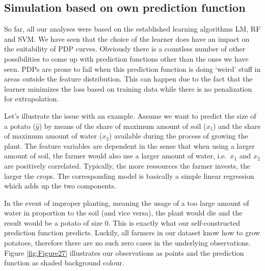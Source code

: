\documentclass[
]{krantz}
\begin{document}
\hypertarget{ExtrapolationProblemPrediction}{%
\subsection{Simulation based on own prediction function}\label{ExtrapolationProblemPrediction}}

So far, all our analyses were based on the established learning algorithms LM, RF and SVM. We have seen that the choice of the learner does have an impact on the suitability of PDP curves. Obviously there is a countless number of other possibilities to come up with prediction functions other than the ones we have seen. PDPs are prone to fail when this prediction function is doing `weird' stuff in areas outside the feature distribution. This can happen due to the fact that the learner minimizes the loss based on training data while there is no penalization for extrapolation.\citep{molnar2019}

Let's illustrate the issue with an example. Assume we want to predict the size of a potato (\(\hat{y}\)) by means of the share of maximum amount of soil (\(x_1\)) and the share of maximum amount of water (\(x_2\)) available during the process of growing the plant. The feature variables are dependent in the sense that when using a larger amount of soil, the farmer would also use a larger amount of water, i.e.~\(x_1\) and \(x_2\) are positively correlated. Typically, the more ressources the farmer invests, the larger the crops. The corresponding model is basically a simple linear regression which adds up the two components.

In the event of improper planting, meaning the usage of a too large amount of water in proportion to the soil (and vice versa), the plant would die and the result would be a potato of size 0. This is exactly what our self-constructed prediction function predicts. Luckily, all farmers in our dataset know how to grow potatoes, therefore there are no such zero cases in the underlying observations. Figure \ref{fig:Figure27} illustrates our observations as points and the prediction function as shaded background colour.
\end{document}
